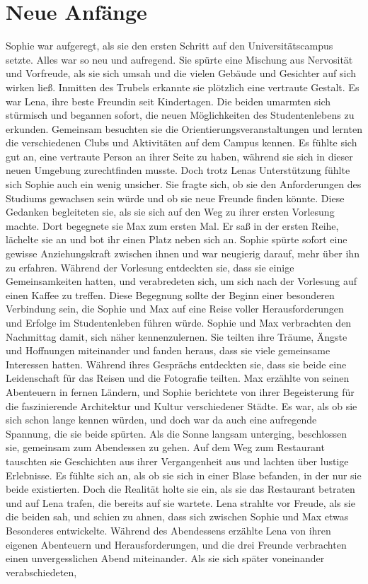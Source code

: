 \documentclass[12pt]{article} %
\begin{document}
\clearpage
\tableofcontents
\clearpage


\section{ Neue Anfänge }
 Sophie war aufgeregt, als sie den ersten Schritt auf den Universitätscampus setzte. Alles war so neu und aufregend. Sie spürte eine Mischung aus Nervosität und Vorfreude, als sie sich umsah und die vielen Gebäude und Gesichter auf sich wirken ließ. Inmitten des Trubels erkannte sie plötzlich eine vertraute Gestalt. Es war Lena, ihre beste Freundin seit Kindertagen. Die beiden umarmten sich stürmisch und begannen sofort, die neuen Möglichkeiten des Studentenlebens zu erkunden. Gemeinsam besuchten sie die Orientierungsveranstaltungen und lernten die verschiedenen Clubs und Aktivitäten auf dem Campus kennen. Es fühlte sich gut an, eine vertraute Person an ihrer Seite zu haben, während sie sich in dieser neuen Umgebung zurechtfinden musste. Doch trotz Lenas Unterstützung fühlte sich Sophie auch ein wenig unsicher. Sie fragte sich, ob sie den Anforderungen des Studiums gewachsen sein würde und ob sie neue Freunde finden könnte. Diese Gedanken begleiteten sie, als sie sich auf den Weg zu ihrer ersten Vorlesung machte. Dort begegnete sie Max zum ersten Mal. Er saß in der ersten Reihe, lächelte sie an und bot ihr einen Platz neben sich an. Sophie spürte sofort eine gewisse Anziehungskraft zwischen ihnen und war neugierig darauf, mehr über ihn zu erfahren. Während der Vorlesung entdeckten sie, dass sie einige Gemeinsamkeiten hatten, und verabredeten sich, um sich nach der Vorlesung auf einen Kaffee zu treffen. Diese Begegnung sollte der Beginn einer besonderen Verbindung sein, die Sophie und Max auf eine Reise voller Herausforderungen und Erfolge im Studentenleben führen würde. Sophie und Max verbrachten den Nachmittag damit, sich näher kennenzulernen. Sie teilten ihre Träume, Ängste und Hoffnungen miteinander und fanden heraus, dass sie viele gemeinsame Interessen hatten. Während ihres Gesprächs entdeckten sie, dass sie beide eine Leidenschaft für das Reisen und die Fotografie teilten. Max erzählte von seinen Abenteuern in fernen Ländern, und Sophie berichtete von ihrer Begeisterung für die faszinierende Architektur und Kultur verschiedener Städte. Es war, als ob sie sich schon lange kennen würden, und doch war da auch eine aufregende Spannung, die sie beide spürten. Als die Sonne langsam unterging, beschlossen sie, gemeinsam zum Abendessen zu gehen. Auf dem Weg zum Restaurant tauschten sie Geschichten aus ihrer Vergangenheit aus und lachten über lustige Erlebnisse. Es fühlte sich an, als ob sie sich in einer Blase befanden, in der nur sie beide existierten. Doch die Realität holte sie ein, als sie das Restaurant betraten und auf Lena trafen, die bereits auf sie wartete. Lena strahlte vor Freude, als sie die beiden sah, und schien zu ahnen, dass sich zwischen Sophie und Max etwas Besonderes entwickelte. Während des Abendessens erzählte Lena von ihren eigenen Abenteuern und Herausforderungen, und die drei Freunde verbrachten einen unvergesslichen Abend miteinander. Als sie sich später voneinander verabschiedeten, 
\end{document}

